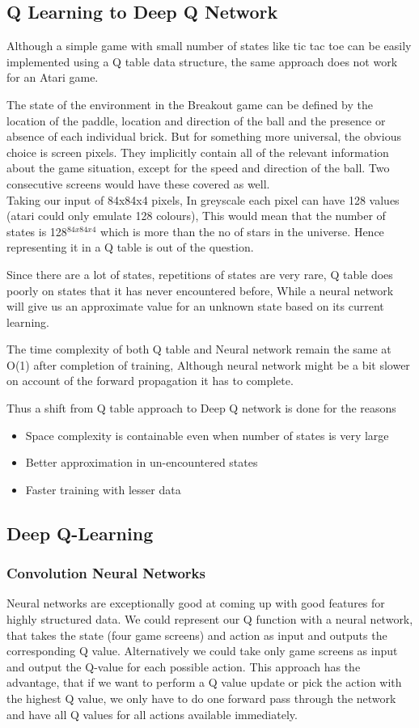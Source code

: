 \documentclass[a4paper,12pt]{report}
\begin{document}
			\subsection{Q Learning to Deep Q Network}
				Although a simple game with small number of states like tic tac toe can be easily implemented using a Q table data structure, the same approach does not work for an Atari game.

				The state of the environment in the Breakout game can be defined by the location of the paddle, location and direction of the ball and the presence or absence of each individual brick. But for something more universal, the obvious choice is screen pixels. They implicitly contain all of the relevant information about the game situation, except for the speed and direction of the ball. Two consecutive screens would have these covered as well.\\

				Taking our input of 84x84x4 pixels, In greyscale each pixel can have 128 values (atari could only emulate 128 colours), This would mean that the number of states is 128$^{84x84x4}$ which is more than the no of stars in the universe. Hence representing it in a Q table is out of the question.

				Since there are a lot of states, repetitions of states are very rare, Q table does poorly on states that it has never encountered before, While a neural network will give us an approximate value for an unknown state based on its current learning. 

				The time complexity of both Q table and Neural network remain the same at O(1) after completion of training, Although neural network might be a bit slower on account of the forward propagation it has to complete.


				Thus a shift from Q table approach to Deep Q network is done for the reasons
				\begin{itemize}
				\item Space complexity is containable even when number of states is very large
				\item Better approximation in un-encountered states
				\item Faster training with lesser data
				\end{itemize}
			\subsection{Deep Q-Learning}
				\subsubsection{Convolution Neural Networks}
					Neural networks are exceptionally good at coming up with good features for highly structured data. We could represent our Q function with a neural network, that takes the state (four game screens) and action as input and outputs the corresponding Q value. Alternatively we could take only game screens as input and output the Q-value for each possible action. This approach has the advantage, that if we want to perform a Q value update or pick the action with the highest Q value, we only have to do one forward pass through the network and have all Q values for all actions available immediately.
\end{document}
